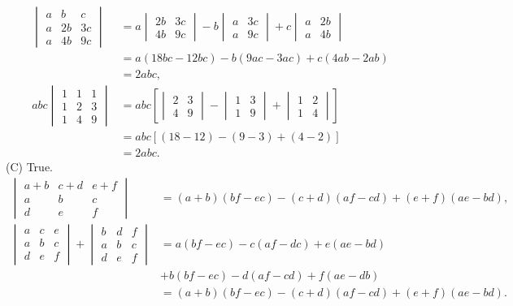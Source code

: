 \documentclass{article}
\begin{document}
\begin{align*}
\begin{vmatrix} 
a & b & c \\ 
a & 2b & 3c \\ 
a & 4b & 9c
\end{vmatrix} 
&= a \begin{vmatrix} 2b & 3c \\ 4b & 9c \end{vmatrix} 
- b \begin{vmatrix} a & 3c \\ a & 9c \end{vmatrix}
+ c \begin{vmatrix} a & 2b \\ a & 4b \end{vmatrix} \\ 
&= a(18bc - 12bc) - b(9ac - 3ac) + c(4ab -2ab) \\
&= 2abc, \\
abc \begin{vmatrix} 
1 & 1 & 1 \\ 
1 & 2 & 3 \\ 
1 & 4 & 9
\end{vmatrix} 
&= abc [{{\begin{vmatrix} 2 & 3 \\ 4 & 9 \end{vmatrix} } - {\begin{vmatrix} 1 & 3 \\ 1 & 9 \end{vmatrix} } + {\begin{vmatrix} 1 & 2 \\ 1 & 4 \end{vmatrix} }}] \\
&= abc [(18-12) - (9-3) + (4-2)] \\
&= 2abc.
\end{align*}
(C) True.
\begin{align*}
\begin{vmatrix} a
+b & c+d & e+f \\ 
a & b & c \\ 
d & e & f
\end{vmatrix}
&= (a + b)(bf - ec) - (c + d)(af - cd) + (e + f)(ae - bd), \\
\begin{vmatrix} 
a & c & e \\ 
a & b & c \\ 
d & e & f
\end{vmatrix} 
+ \begin{vmatrix} 
b & d & f \\ 
a & b & c \\ 
d & e & f
\end{vmatrix}
&= a (bf - ec) - c(af - dc) + e(ae - bd)  \\
&+ b(bf - ec) - d(af - cd) + f(ae - db) \\
&= (a + b)(bf - ec) - (c + d)(af - cd) + (e + f)(ae - bd).
\end{align*}
\end{document}

